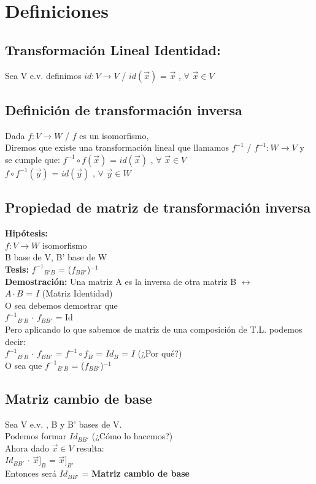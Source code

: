 \documentclass[11pt]{article}
\begin{document}
\section{Definiciones}
\subsection{Transformación Lineal Identidad:}
Sea V e.v. definimos $id: V \rightarrow V$ / $id(\vec{x})$ = $\vec{x}$ , $\forall$ $\vec{x} \in V$
\subsection{Definición de transformación inversa}
Dada $f : V \rightarrow W$ / $f$ es un isomorfismo,\\
Diremos que existe una transformación lineal que llamamos $f^{-1}$ / $f^{-1} : W \rightarrow V$ y se cumple que:
$f^{-1} \circ f (\vec{x})$ = $id(\vec{x})$ , $\forall$ $\vec{x} \in V$ \\
$f \circ f^{-1} (\vec{y})$ = $id(\vec{y})$ , $\forall$ $\vec{y} \in W$
\newpage
\subsection{Propiedad de matriz de transformación inversa}
{\bfseries {Hipótesis:}} \\
$f : V \rightarrow W$ isomorfismo \\
B base de V, B' base de W \\
{\bfseries {Tesis:}}
\textbardbl $f^{-1}$\textbardbl$_{B'B}$ = 
(\textbardbl $f$\textbardbl$_{BB'}$)$^{-1}$ \\
{\bfseries {Demostración:}} Una matriz A es la inversa de otra matriz B $\leftrightarrow$ \\
$A \cdot B$ = $I$ (Matriz Identidad)\\
O sea debemos demostrar que \\
\textbardbl $f^{-1}$\textbardbl$_{B'B}$ 
$\cdot$ 
\textbardbl $f$\textbardbl$_{BB'}$ = Id \\
Pero aplicando lo que sabemos de matriz de una composición de T.L. podemos decir: \\
\textbardbl $f^{-1}$\textbardbl$_{B'B}$ 
$\cdot$ 
\textbardbl $f$\textbardbl$_{BB'}$ =
\textbardbl $f^{-1} \circ f$\textbardbl$_{B}$ = 
\textbardbl $Id$\textbardbl$_{B}$ = $I$ (¿Por qué?) \\
O sea que 
\textbardbl $f^{-1}$\textbardbl$_{B'B}$ = 
(\textbardbl $f$\textbardbl$_{BB'}$)$^{-1}$
\subsection{Matriz cambio de base}
Sea V e.v. , B y B’ bases de V. \\
Podemos formar \textbardbl $Id$\textbardbl$_{BB'}$ (¿Cómo lo hacemos?) \\
Ahora dado $\vec{x} \in V$ resulta: \\
\textbardbl $Id$\textbardbl$_{BB'}$ 
$\cdot$ $\vec{x}]_{B}$ = $\vec{x}]_{B'}$ \\
Entonces será \textbardbl $Id$\textbardbl$_{BB'}$ = 
{\bfseries{Matriz cambio de base}}
\end{document}
